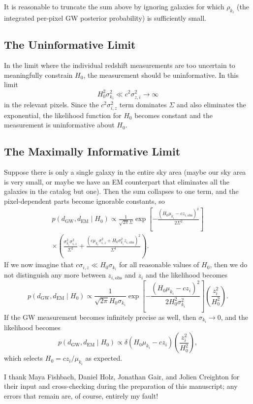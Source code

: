 \documentclass[modern]{aastex62}
\newcommand{\dEM}{d_{\mathrm{EM}}}
\newcommand{\dGW}{d_{\mathrm{GW}}}
\begin{document}
It is reasonable to truncate the sum above by ignoring galaxies for which
$\rho_{k_i}$ (the integrated per-pixel \ac{GW} posterior probability) is
sufficiently small.

\subsection{The Uninformative Limit}

In the limit where the individual redshift measurements are too uncertain to
meaningfully constrain $H_0$, the measurement should be uninformative.  In this
limit
%
\begin{equation}
  H_0^2 \sigma_{k_i}^2 \ll c^2 \sigma_{z,i}^2 \to \infty
\end{equation}
%
in the relevant pixels.  Since the $c^2 \sigma_{i,z}^2$ term dominates $\Sigma$
and also eliminates the exponential, the likelihood function for $H_0$ becomes
constant and the measurement is uninformative about $H_0$.

\subsection{The Maximally Informative Limit}

Suppose there is only a single galaxy in the entire sky area (maybe our sky area
is very small, or maybe we have an \ac{EM} counterpart that eliminates all the
galaxies in the catalog but one).  Then the sum collapses to one term, and the
pixel-dependent parts become ignorable constants, so
%
\begin{multline}
  p\left( \dGW, \dEM \mid H_0 \right) \propto \frac{1}{\sqrt{2\pi} \Sigma} \exp\left[ -\frac{\left(H_0 \mu_{k_i} - c z_{i,\mathrm{obs}}\right)^2}{2 \Sigma^2} \right] \\ \times \left( \frac{\sigma_{k_i}^2 \sigma_{i,z}^2}{\Sigma^2} + \frac{\left( c \mu_{k_i} \sigma_{i,z}^2 + H_0 \sigma_{k_i}^2 z_{i,\mathrm{obs}} \right)^2}{\Sigma^4} \right).
\end{multline}
%
If we now imagine that $c \sigma_{i,z} \ll H_0 \sigma_{k_i}$ for all reasonable
values of $H_0$, then we do not distinguish any more between
$z_{i,\mathrm{obs}}$ and $z_i$ and the likelihood becomes
%
\begin{equation}
  p\left( \dGW, \dEM \mid H_0 \right) \propto \frac{1}{\sqrt{2\pi} H_0 \sigma_{k_i}} \exp\left[ -\frac{\left(H_0 \mu_{k_i} - c z_{i}\right)^2}{2 H_0^2 \sigma_{k_i}^2} \right] \left( \frac{z_{i}^2}{H_0^2} \right).
\end{equation}
%
If the \ac{GW} measurement becomes infinitely precise as well, then
$\sigma_{k_i} \to 0$, and the likelihood becomes
%
\begin{equation}
  p\left( \dGW, \dEM \mid H_0 \right) \propto \delta \left( H_0 \mu_{k_i} - c z_{i}\right) \left( \frac{z_{i}^2}{H_0^2} \right),
\end{equation}
%
which selects $H_0 = c z_i / \mu_{k_i}$ as expected.

\acknowledgements

I thank Maya Fishbach, Daniel Holz, Jonathan Gair, and Jolien Creighton for
their input and cross-checking during the preparation of this manuscript; any
errors that remain are, of course, entirely my fault!


\end{document}
